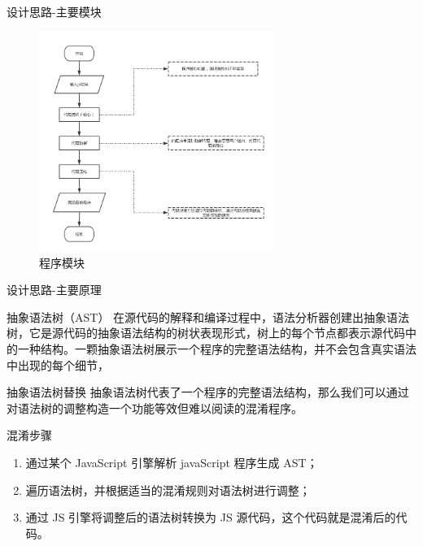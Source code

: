 \documentclass[presentation]{beamer}
\begin{document}
\begin{frame}[label=sec-7]{设计思路-主要模块}
\begin{center}
\begin{figure}[htb]
\centering
\includegraphics[width=3in]{./presentation03-00.png}
\caption{程序模块}
\end{figure}
\end{center}
\end{frame}
\begin{frame}[label=sec-8]{设计思路-主要原理}
\begin{block}{抽象语法树（AST）}
在源代码的解释和编译过程中，语法分析器创建出抽象语法树，它是源代码的抽象语法结构的树状表现形式，树上的每个节点都表示源代码中的一种结构。一颗抽象语法树展示一个程序的完整语法结构，并不会包含真实语法中出现的每个细节，
\end{block}
\begin{block}{抽象语法树替换}
抽象语法树代表了一个程序的完整语法结构，那么我们可以通过对语法树的调整构造一个功能等效但难以阅读的混淆程序。
\end{block}
\begin{block}{混淆步骤}
\begin{enumerate}
\item 通过某个 JavaScript 引擎解析 javaScript 程序生成 AST；
\item 遍历语法树，并根据适当的混淆规则对语法树进行调整；
\item 通过 JS 引擎将调整后的语法树转换为 JS 源代码，这个代码就是混淆后的代码。
\end{enumerate}
\end{block}
\end{frame}
\end{document}
